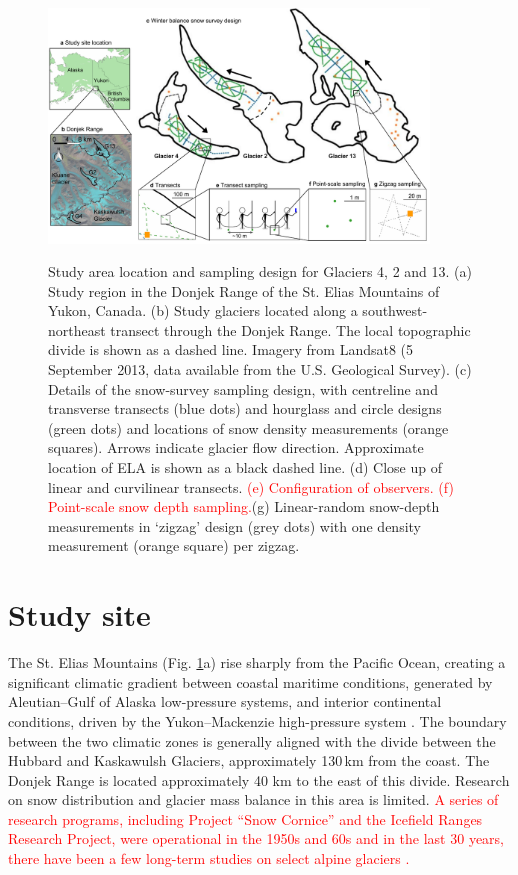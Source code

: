 \documentclass[review,oneside, letterpaper]{igs}
\begin{document}
\begin{figure}
	\centering
	\includegraphics[width =0.9\textwidth]{Sampling.pdf}\\
	\caption{Study area location and sampling design for Glaciers 4, 2 and 13. (a) Study region in the Donjek Range of the St. Elias Mountains of Yukon, Canada. (b) Study glaciers located along a southwest-northeast transect through the Donjek Range. The local topographic divide is shown as a dashed line. Imagery from Landsat8 (5 September 2013, data available from the U.S. Geological Survey). (c) Details of the snow-survey sampling design, with centreline and transverse transects (blue dots) and hourglass and circle designs (green dots) and locations of snow density measurements (orange squares). Arrows indicate glacier flow direction. Approximate location of ELA is shown as a black dashed line. (d) Close up of linear and curvilinear transects. \textcolor{red}{(e) Configuration of observers. (f) Point-scale snow depth sampling.}(g) Linear-random snow-depth measurements in `zigzag' design (grey dots) with one density measurement (orange square) per zigzag.}
	\label{fig:Sampling}
\end{figure}

\section{Study site}

The St. Elias Mountains (Fig. \ref{fig:Sampling}a) rise sharply from the Pacific Ocean, creating a significant climatic gradient between coastal maritime conditions, generated by Aleutian--Gulf of Alaska low-pressure systems, and interior continental conditions, driven by the Yukon--Mackenzie high-pressure system \citep{Taylor1969}. The boundary between the two climatic zones is generally aligned with the divide between the Hubbard and Kaskawulsh Glaciers, approximately 130\,km from the coast. The Donjek Range is located approximately 40 km to the east of this divide. Research on snow distribution and glacier mass balance in this area is limited. \textcolor{red}{A series of research programs, including Project ``Snow Cornice''  and the Icefield Ranges Research Project, were operational in the 1950s and 60s \citep{Wood1948, Danby2003} and in the last 30 years, there have been a few long-term studies on select alpine glaciers \citep{Clarke2014}.}
\end{document}
